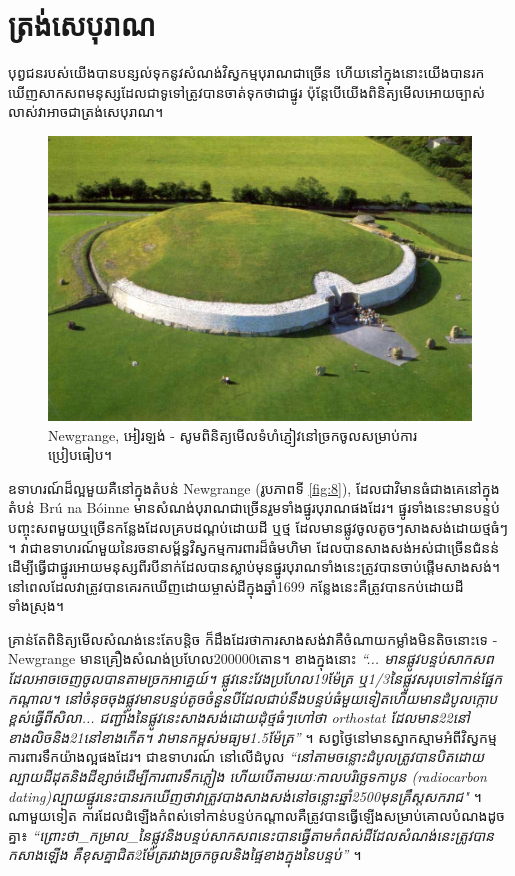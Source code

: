 \documentclass[10pt,twocolumn,letterpaper]{article}
\begin{document}
\section{ត្រង់សេបុរាណ}

បុព្វជនរបស់យើងបានបន្សល់ទុកនូវសំណង់វិស្វកម្មបុរាណជាច្រើន ហើយនៅក្នុងនោះយើងបានរកឃើញសាកសពមនុស្សដែលជាទូទៅត្រូវបានចាត់ទុកថាជាផ្នូរ ប៉ុន្តែបើយើងពិនិត្យមើលអោយច្បាស់លាស់វាអាចជាត្រង់សេបុរាណ។

\begin{figure}[b]
\begin{center}
   \includegraphics[width=1\linewidth]{ww19.jpg}
\end{center}
   \caption{Newgrange, អៀរឡង់ - សូមពិនិត្យមើលទំហំភ្ញៀវនៅច្រកចូលសម្រាប់ការប្រៀបធៀប។}
\label{fig:8}
\label{fig:onecol}
\end{figure}

ឧទាហរណ៍ដ៏ល្អមួយគឺនៅក្នុងតំបន់ Newgrange (រូបភាពទី \ref{fig:8}), ដែលជាវិមានធំជាងគេនៅក្នុងតំបន់ Brú na Bóinne មានសំណង់បុរាណជាច្រើនរួមទាំងផ្នូរបុរាណផងដែរ។ ផ្នូរទាំងនេះមានបន្ទប់បញ្ចុះសពមួយឬច្រើនកន្លែងដែលគ្របដណ្តប់ដោយដី ឬថ្ម ដែលមានផ្លូវចូលតូចៗសាងសង់ដោយថ្មធំៗ \cite{70}។ វាជាឧទាហរណ៍មួយនៃរចនាសម្ព័ន្ធវិស្វកម្មការពារដ៏ធំមហិមា ដែលបានសាងសង់អស់ជាច្រើនជំនន់ដើម្បីធ្វើជាផ្នូរអោយមនុស្សពីរបីនាក់ដែលបានស្លាប់មុនផ្នូរបុរាណទាំងនេះត្រូវបានចាប់ផ្តើមសាងសង់។ នៅពេលដែលវាត្រូវបានគេរកឃើញដោយម្ចាស់ដីក្នុងឆ្នាំ1699 កន្លែងនេះគឺត្រូវបានកប់ដោយដីទាំងស្រុង។

គ្រាន់តែពិនិត្យមើលសំណង់នេះតែបន្តិច ក៏ដឹងដែរថាការសាងសង់វាគឺចំណាយកម្លាំងមិនតិចនោះទេ - Newgrange មានគ្រឿងសំណង់ប្រហែល200000តោន។ ខាងក្នុងនោះ \textit{“... មានផ្លូវបន្ទប់សាកសពដែលអាចចេញចូលបានតាមច្រកអាគ្នេយ៍។ ផ្លូវនេះវែងប្រហែល19ម៉ែត្រ ឬ1/3នៃផ្លូវសរុបទៅកាន់ផ្នែកកណ្ដាល។ នៅចំនុចចុងផ្លូវមានបន្ទប់តូចចំនួនបីដែលជាប់នឹងបន្ទប់ធំមួយទៀតហើយមានដំបូលក្កោបខ្ពស់ធ្វើពីសិលា... ជញ្ជាំងនៃផ្លូវនេះសាងសង់ដោយដុំថ្មធំៗហៅថា orthostat ដែលមាន22នៅខាងលិចនិង21នៅខាងកើត។ វាមានកម្ពស់មធ្យម1.5ម៉ែត្រ”} \cite{70}។ សព្វថ្ងៃនៅមានស្នាកស្មាមអំពីវិស្វកម្មការពារទឹកយ៉ាងល្អផងដែរ។ ជាឧទាហរណ៍ នៅលើដំបូល \textit{“នៅតាមចន្លោះដំបូលត្រូវបានបិតដោយល្បាយដីដុតនិងដីខ្សាច់ដើម្បីការពារទឹកភ្លៀង ហើយបើតាមរយៈកាលបរិច្ឆេទកាបូន (radiocarbon dating)ល្បាយផ្នូរនេះបានរកឃើញថាវាត្រូវបាងសាងសង់នៅចន្លោះឆ្នាំ2500មុនគ្រឹស្តសករាជ"} \cite{71}។ ណាមួយទៀត ការដែលដំឡើងកំពស់ទៅកាន់បន្ទប់កណ្តាលគឺត្រូវបានធ្វើឡើងសម្រាប់គោលបំណងដូចគ្នា៖ \textit{“ព្រោះថា\_កម្រាល\_នៃផ្លូវនិងបន្ទប់សាកសពនេះបានធ្វើតាមកំពស់ដីដែលសំណង់នេះត្រូវបានកសាងឡើង គឺខុសគ្នាជិត2ម៉ែត្ររវាងច្រកចូលនិងផ្ទៃខាងក្នុងនៃបន្ទប់”} \cite{71}។
\end{document}

